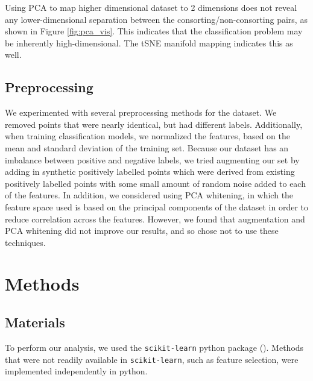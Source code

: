 \documentclass[twoside,twocolumn,paper=letter,fontsize=11pt]{article}
\begin{document}
Using PCA to map higher dimensional dataset to 2 dimensions does not reveal
any lower-dimensional separation between the consorting/non-consorting pairs, as
shown in Figure \ref{fig:pca_vis}.
This indicates that the classification problem may be inherently
high-dimensional. The tSNE manifold mapping indicates this as well.

\subsection{Preprocessing}

We experimented with several preprocessing methods for the dataset. We removed
points that were nearly identical, but had different labels. Additionally, when
training classification models, we normalized the features, based on the mean
and standard deviation of the training set. Because our dataset has an imbalance
between positive and negative labels, we tried augmenting our set by adding in
synthetic positively labelled points which were derived from existing positively
labelled points with some small amount of random noise added to each of the
features. In addition, we considered using PCA whitening, in which the feature
space used is based on the principal components of the dataset in order to
reduce correlation across the features. However, we found that augmentation and
PCA whitening did not improve our results, and so chose not to use these
techniques.

\section{Methods}
\subsection{Materials}

To perform our analysis, we used the \texttt{scikit-learn} python package (\cite{Pegregosa:2011}). Methods
that were not readily available in \texttt{scikit-learn}, such as feature selection, were
implemented independently in python.
\end{document}
